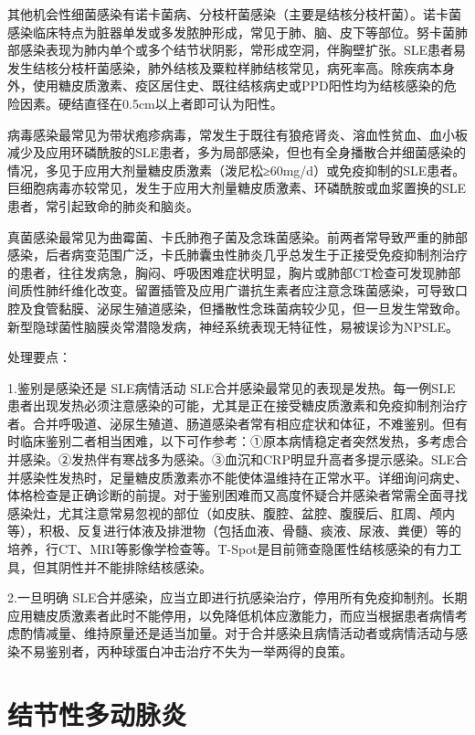 其他机会性细菌感染有诺卡菌病、分枝杆菌感染（主要是结核分枝杆菌）。诺卡菌感染临床特点为脏器单发或多发脓肿形成，常见于肺、脑、皮下等部位。努卡菌肺部感染表现为肺内单个或多个结节状阴影，常形成空洞，伴胸壁扩张。SLE患者易发生结核分枝杆菌感染，肺外结核及粟粒样肺结核常见，病死率高。除疾病本身外，使用糖皮质激素、疫区居住史、既往结核病史或PPD阳性均为结核感染的危险因素。硬结直径在0.5cm以上者即可认为阳性。

病毒感染最常见为带状疱疹病毒，常发生于既往有狼疮肾炎、溶血性贫血、血小板减少及应用环磷酰胺的SLE患者，多为局部感染，但也有全身播散合并细菌感染的情况，多见于应用大剂量糖皮质激素（泼尼松≥60mg/d）或免疫抑制的SLE患者。巨细胞病毒亦较常见，发生于应用大剂量糖皮质激素、环磷酰胺或血浆置换的SLE患者，常引起致命的肺炎和脑炎。

真菌感染最常见为曲霉菌、卡氏肺孢子菌及念珠菌感染。前两者常导致严重的肺部感染，后者病变范围广泛，卡氏肺囊虫性肺炎几乎总发生于正接受免疫抑制剂治疗的患者，往往发病急，胸闷、呼吸困难症状明显，胸片或肺部CT检查可发现肺部间质性肺纤维化改变。留置插管及应用广谱抗生素者应注意念珠菌感染，可导致口腔及食管黏膜、泌尿生殖道感染，但播散性念珠菌病较少见，但一旦发生常致命。新型隐球菌性脑膜炎常潜隐发病，神经系统表现无特征性，易被误诊为NPSLE。

处理要点：

1.鉴别是感染还是 SLE病情活动
SLE合并感染最常见的表现是发热。每一例SLE患者出现发热必须注意感染的可能，尤其是正在接受糖皮质激素和免疫抑制剂治疗者。合并呼吸道、泌尿生殖道、肠道感染者常有相应症状和体征，不难鉴别。但有时临床鉴别二者相当困难，以下可作参考：①原本病情稳定者突然发热，多考虑合并感染。②发热伴有寒战多为感染。③血沉和CRP明显升高者多提示感染。SLE合并感染性发热时，足量糖皮质激素亦不能使体温维持在正常水平。详细询问病史、体格检查是正确诊断的前提。对于鉴别困难而又高度怀疑合并感染者常需全面寻找感染灶，尤其注意常易忽视的部位（如皮肤、腹腔、盆腔、腹膜后、肛周、颅内等），积极、反复进行体液及排泄物（包括血液、骨髓、痰液、尿液、粪便）等的培养，行CT、MRI等影像学检查等。T-Spot是目前筛查隐匿性结核感染的有力工具，但其阴性并不能排除结核感染。

2.一旦明确
SLE合并感染，应当立即进行抗感染治疗，停用所有免疫抑制剂。长期应用糖皮质激素者此时不能停用，以免降低机体应激能力，而应当根据患者病情考虑酌情减量、维持原量还是适当加量。对于合并感染且病情活动者或病情活动与感染不易鉴别者，丙种球蛋白冲击治疗不失为一举两得的良策。

\protect\hypertarget{text00348.html}{}{}

\chapter{结节性多动脉炎}

